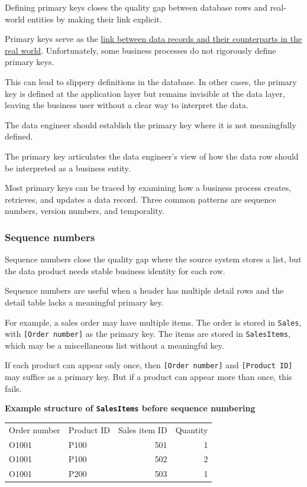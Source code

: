 \documentclass[10pt,openany,10pt]{book}
\newcounter{none}
\let\podeToprule\toprule
\let\podeMidrule\midrule
\let\podeBottomrule\bottomrule
\renewcommand{\toprule}{\arrayrulecolor{pbiGrid}\podeToprule}
\renewcommand{\midrule}{\arrayrulecolor{pbiGrid}\podeMidrule}
\renewcommand{\bottomrule}{\arrayrulecolor{pbiGrid}\podeBottomrule}
\begin{document}
Defining primary keys closes the quality gap between database rows and
real-world entities by making their link explicit.

Primary keys serve as the
\hyperref[docs-creating-information-mapping-the-data-world]{link between
data records and their counterparts in the real world}. Unfortunately,
some business processes do not rigorously define primary keys.

This can lead to slippery definitions in the database. In other cases,
the primary key is defined at the application layer but remains
invisible at the data layer, leaving the business user without a clear
way to interpret the data.

The data engineer should establish the primary key where it is not
meaningfully defined.

The primary key articulates the data engineer's view of how the data row
should be interpreted as a business entity.

Most primary keys can be traced by examining how a business process
creates, retrieves, and updates a data record. Three common patterns are
sequence numbers, version numbers, and temporality.

\subsubsection{Sequence numbers}\label{sequence-numbers}

Sequence numbers close the quality gap where the source system stores a
list, but the data product needs stable business identity for each row.

Sequence numbers are useful when a header has multiple detail rows and
the detail table lacks a meaningful primary key.

For example, a sales order may have multiple items. The order is stored
in \texttt{Sales}, with \texttt{{[}Order\ number{]}} as the primary key.
The items are stored in \texttt{SalesItems}, which may be a
miscellaneous list without a meaningful key.

If each product can appear only once, then \texttt{{[}Order\ number{]}}
and \texttt{{[}Product\ ID{]}} may suffice as a primary key. But if a
product can appear more than once, this fails.

\textbf{Example structure of \texttt{SalesItems} before sequence
numbering}

{\def\LTcaptype{none} %
\begin{longtable}[]{@{}llrr@{}}
\toprule\noalign{}
Order number & Product ID & Sales item ID & Quantity \\
\midrule\noalign{}
\endhead
\bottomrule\noalign{}
\endlastfoot
O1001 & P100 & 501 & 1 \\
O1001 & P100 & 502 & 2 \\
O1001 & P200 & 503 & 1 \\
\end{longtable}
}
\end{document}

